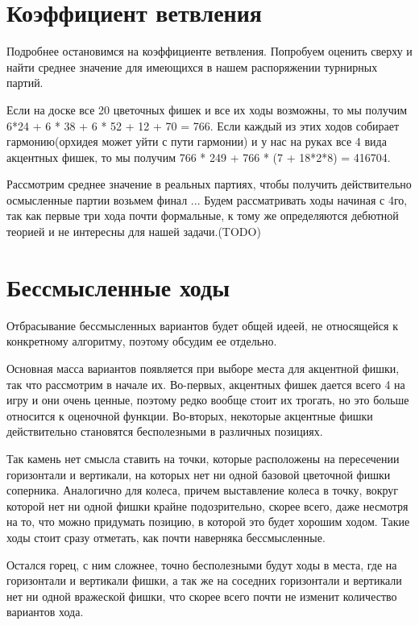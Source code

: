 \documentclass[a4paper,12pt]{diplom}
\begin{document}
\section{Коэффициент ветвления}

Подробнее остановимся на коэффициенте ветвления. Попробуем оценить сверху и найти среднее значение для имеющихся в нашем распоряжении турнирных партий.

Если на доске все 20 цветочных фишек и все их ходы возможны, то мы получим 6*24 + 6 * 38 + 6 * 52 + 12 + 70 = 766. Если каждый из этих ходов собирает гармонию(орхидея может уйти с пути гармонии) и у нас на руках все 4 вида акцентных фишек, то мы получим 766 * 249 + 766 * (7 + 18*2*8) = 416704.

Рассмотрим среднее значение в реальных партиях, чтобы получить действительно осмысленные партии возьмем финал ... Будем рассматривать ходы начиная с 4го, так как первые три хода почти формальные, к тому же определяются дебютной теорией и не интересны для нашей задачи.(TODO)

\section{Бессмысленные ходы}

Отбрасывание бессмысленных вариантов будет общей идеей, не относящейся к конкретному алгоритму, поэтому обсудим ее отдельно.

Основная масса вариантов появляется при выборе места для акцентной фишки, так что рассмотрим в начале их. Во-первых, акцентных фишек дается всего 4 на игру и они очень ценные, поэтому редко вообще стоит их трогать, но это больше относится к оценочной функции. Во-вторых, некоторые акцентные фишки действительно становятся бесполезными в различных позициях.

Так камень нет смысла ставить на точки, которые расположены на пересечении горизонтали и вертикали, на которых нет ни одной базовой цветочной фишки соперника. 
Аналогично для колеса, причем выставление колеса в точку, вокруг которой нет ни одной фишки крайне подозрительно, скорее всего, даже несмотря на то, что можно придумать позицию, в которой это будет хорошим ходом. Такие ходы стоит сразу отметать, как почти наверняка бессмысленные. 

Остался горец, с ним сложнее, точно бесполезными будут ходы в места, где на горизонтали и вертикали фишки, а так же на соседних горизонтали и вертикали нет ни одной вражеской фишки, что скорее всего почти не изменит количество вариантов хода.
 
\end{document}
